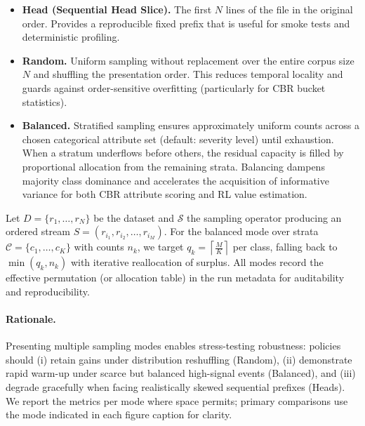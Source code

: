 \begin{itemize}
  \item \textbf{Head (Sequential Head Slice).} The first \(N\) lines of the file in the original order. Provides a reproducible fixed prefix that is useful for smoke tests and deterministic profiling.
  \item \textbf{Random.} Uniform sampling without replacement over the entire corpus size \(N\) and shuffling the presentation order. This reduces temporal locality and guards against order-sensitive overfitting (particularly for CBR bucket statistics).
  \item \textbf{Balanced.} Stratified sampling ensures approximately uniform counts across a chosen categorical attribute set (default: severity level) until exhaustion. When a stratum underflows before others, the residual capacity is filled by proportional allocation from the remaining strata. Balancing dampens majority class dominance and accelerates the acquisition of informative variance for both CBR attribute scoring and RL value estimation.
\end{itemize}

Let \(D = \{r_1,\dots,r_N\}\) be the dataset and \(\mathcal{S}\) the sampling operator producing an ordered stream \(S = (r_{i_1}, r_{i_2}, \dots, r_{i_M})\). For the balanced mode over strata \(\mathcal{C} = \{c_1,\dots,c_K\}\) with counts \(n_k\), we target \(q_k = \left\lceil \frac{M}{K} \right\rceil\) per class, falling back to \(\min(q_k, n_k)\) with iterative reallocation of surplus. All modes record the effective permutation (or allocation table) in the run metadata for auditability and reproducibility.

\paragraph{Rationale.} Presenting multiple sampling modes enables stress-testing robustness: policies should (i) retain gains under distribution reshuffling (Random), (ii) demonstrate rapid warm-up under scarce but balanced high-signal events (Balanced), and (iii) degrade gracefully when facing realistically skewed sequential prefixes (Heads). We report the metrics per mode where space permits; primary comparisons use the mode indicated in each figure caption for clarity.

